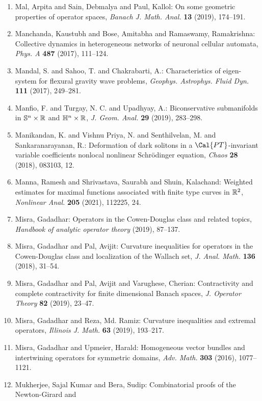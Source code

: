 \begin{enumerate}
\item Mal, Arpita and Sain, Debmalya and Paul, Kallol: On some geometric properties of operator spaces, \emph{Banach J. Math. Anal.} {\bf 13} (2019), 174--191.
\item Manchanda, Kaustubh and Bose, Amitabha and Ramaswamy,
Ramakrishna: Collective dynamics in heterogeneous networks of neuronal
cellular automata, \emph{Phys. A} {\bf 487} (2017), 111--124.
\item Mandal, S. and Sahoo, T. and Chakrabarti, A.: Characteristics of eigen-system for flexural gravity wave
problems, \emph{Geophys. Astrophys. Fluid Dyn.} {\bf 111} (2017), 249--281.
\item Manfio, F. and Turgay, N. C. and Upadhyay, A.: Biconservative submanifolds in {$\Bbb{S}^n\times\Bbb{R}$} and
{$\Bbb{H}^n\times\Bbb{R}$}, \emph{J. Geom. Anal.} {\bf 29} (2019), 283--298.
\item Manikandan, K. and Vishnu Priya, N. and Senthilvelan, M. and
Sankaranarayanan, R.: Deformation of dark solitons in a {$\Cal{PT}$}-invariant
variable coefficients nonlocal nonlinear {S}chr\"{o}dinger
equation, \emph{Chaos} {\bf 28} (2018), 083103, 12.
\item Manna, Ramesh and Shrivastava, Saurabh and Shuin, Kalachand: Weighted estimates for maximal functions associated with
finite type curves in {$\Bbb R^2$}, \emph{Nonlinear Anal.} {\bf 205} (2021), 112225, 24.
\item Misra, Gadadhar: Operators in the {C}owen-{D}ouglas class and related topics, \emph{Handbook of analytic operator theory} {\bf } (2019), 87--137.
\item Misra, Gadadhar and Pal, Avijit: Curvature inequalities for operators in the {C}owen-{D}ouglas
class and localization of the {W}allach set, \emph{J. Anal. Math.} {\bf 136} (2018), 31--54.
\item Misra, Gadadhar and Pal, Avijit and Varughese, Cherian: Contractivity and complete contractivity for finite
dimensional {B}anach spaces, \emph{J. Operator Theory} {\bf 82} (2019), 23--47.
\item Misra, Gadadhar and Reza, Md. Ramiz: Curvature inequalities and extremal operators, \emph{Illinois J. Math.} {\bf 63} (2019), 193--217.
\item Misra, Gadadhar and Upmeier, Harald: Homogeneous vector bundles and intertwining operators for
symmetric domains, \emph{Adv. Math.} {\bf 303} (2016), 1077--1121.
\item Mukherjee, Sajal Kumar and Bera, Sudip: Combinatorial proofs of the {N}ewton-{G}irard and

\end{enumerate}
